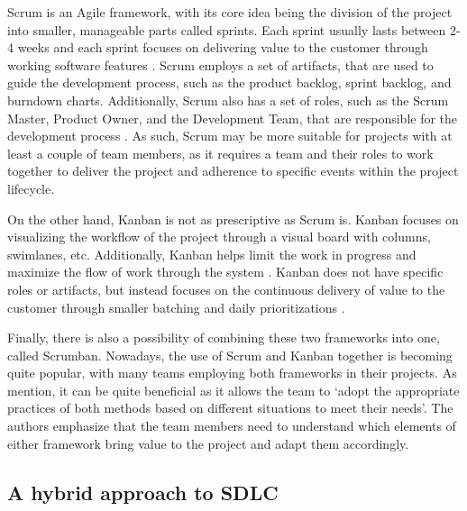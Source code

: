 Scrum is an Agile framework, with its core idea being the division of the project into smaller, manageable parts called sprints. Each sprint usually lasts between 2-4 weeks and each sprint focuses on delivering value to the customer through working software features \parencite{scrumban, agile}. Scrum employs a set of artifacts, that are used to guide the development process, such as the product backlog, sprint backlog, and burndown charts. Additionally, Scrum also has a set of roles, such as the Scrum Master, Product Owner, and the Development Team, that are responsible for the development process \parencite{scrumban}. As such, Scrum may be more suitable for projects with at least a couple of team members, as it requires a team and their roles to work together to deliver the project and adherence to specific events within the project lifecycle.

On the other hand, Kanban is not as prescriptive as Scrum is. Kanban focuses on visualizing the workflow of the project through a visual board with columns, swimlanes, etc. Additionally, Kanban helps limit the work in progress and maximize the flow of work through the system \parencite{agile}. Kanban does not have specific roles or artifacts, but instead focuses on the continuous delivery of value to the customer through smaller batching and daily prioritizations \parencite{scrumban}.

Finally, there is also a possibility of combining these two frameworks into one, called Scrumban. Nowadays, the use of Scrum and Kanban together is becoming quite popular, with many teams employing both frameworks in their projects. As \textcite{scrumban} mention, it can be quite beneficial as it allows the team to `adopt the appropriate practices of both methods based on different situations to meet their needs'. The authors emphasize that the team members need to understand which elements of either framework bring value to the project and adapt them accordingly.

\subsection{A hybrid approach to SDLC}


